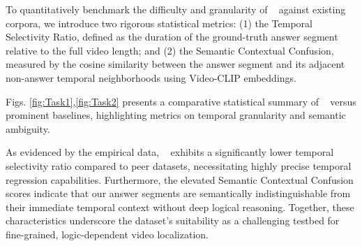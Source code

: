 To quantitatively benchmark the difficulty and granularity of \BenchmarkName~ against existing corpora, we introduce two rigorous statistical metrics: (1) the Temporal Selectivity Ratio, defined as the duration of the ground-truth answer segment relative to the full video length; and (2) the Semantic Contextual Confusion, measured by the cosine similarity between the answer segment and its adjacent non-answer temporal neighborhoods using Video-CLIP\cite{videoclip} embeddings.

Figs. \ref{fig:Task1},\ref{fig:Task2} presents a comparative statistical summary of \BenchmarkName~ versus prominent baselines, highlighting metrics on temporal granularity and semantic ambiguity.

As evidenced by the empirical data, \BenchmarkName~ exhibits a significantly lower temporal selectivity ratio compared to peer datasets, necessitating highly precise temporal regression capabilities. Furthermore, the elevated Semantic Contextual Confusion scores indicate that our answer segments are semantically indistinguishable from their immediate temporal context without deep logical reasoning. Together, these characteristics underscore the dataset's suitability as a challenging testbed for fine-grained, logic-dependent video localization.